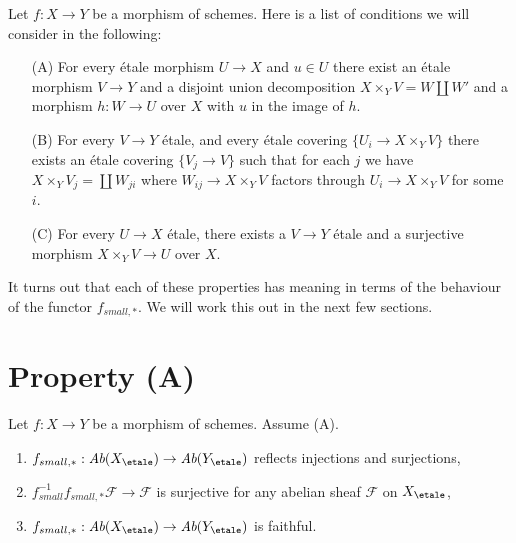 \noindent
Let $f : X \to Y$ be a morphism of schemes.
Here is a list of conditions we will consider in the following:
\begin{enumerate}
\item[(A)] For every \'etale morphism $U \to X$ and $u \in U$ there exist
an \'etale morphism $V \to Y$ and a disjoint union decomposition
$X \times_Y V = W \amalg W'$ and a morphism $h : W \to U$ over $X$
with $u$ in the image of $h$.
\item[(B)] For every $V \to Y$ \'etale, and every \'etale covering
$\{U_i \to X \times_Y V\}$ there exists an \'etale covering
$\{V_j \to V\}$ such that for each $j$ we have
$X \times_Y V_j = \coprod W_{ji}$ where $W_{ij} \to X \times_Y V$
factors through $U_i \to X \times_Y V$ for some $i$.
\item[(C)] For every $U \to X$ \'etale, there exists a $V \to Y$ \'etale
and a surjective morphism $X \times_Y V \to U$ over $X$.
\end{enumerate}
It turns out that each of these properties has meaning in terms of
the behaviour of the functor $f_{small, *}$. We will work this
out in the next few sections.



\section{Property (A)}
\label{section-A}

\begin{lemma}
\label{lemma-property-A-implies}
Let $f : X \to Y$ be a morphism of schemes.
Assume (A).
\begin{enumerate}
\item
$f_{small, *} :
\textit{Ab}(X_\etale)
\to
\textit{Ab}(Y_\etale)$
reflects injections and surjections,
\item $f_{small}^{-1}f_{small, *}\mathcal{F} \to \mathcal{F}$
is surjective for any abelian sheaf $\mathcal{F}$ on $X_\etale$,
\item
$f_{small, *} :
\textit{Ab}(X_\etale)
\to
\textit{Ab}(Y_\etale)$
is faithful.
\end{enumerate}
\end{lemma}

